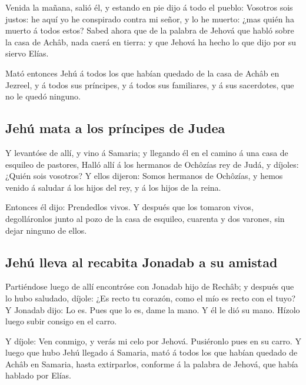  Venida la mañana, salió él, y estando en pie dijo á todo el
pueblo: Vosotros sois justos: he aquí yo he conspirado contra mi señor,
y lo he muerto: ¿mas quién ha muerto á todos estos?  Sabed
ahora que de la palabra de Jehová que habló sobre la casa de Achâb, nada
caerá en tierra: y que Jehová ha hecho lo que dijo por su siervo Elías.

 Mató entonces Jehú á todos los que habían quedado de la
casa de Achâb en Jezreel, y á todos sus príncipes, y á todos sus
familiares, y á sus sacerdotes, que no le quedó ninguno.

\hypertarget{jehuxfa-mata-a-los-pruxedncipes-de-judea}{%
\subsection{Jehú mata a los príncipes de
Judea}\label{jehuxfa-mata-a-los-pruxedncipes-de-judea}}

 Y levantóse de allí, y vino á Samaria; y llegando él en el
camino á una casa de esquileo de pastores,  Halló allí á
los hermanos de Ochôzías rey de Judá, y díjoles: ¿Quién sois vosotros? Y
ellos dijeron: Somos hermanos de Ochôzías, y hemos venido á saludar á
los hijos del rey, y á los hijos de la reina.

 Entonces él dijo: Prendedlos vivos. Y después que los
tomaron vivos, degolláronlos junto al pozo de la casa de esquileo,
cuarenta y dos varones, sin dejar ninguno de ellos.

\hypertarget{jehuxfa-lleva-al-recabita-jonadab-a-su-amistad}{%
\subsection{Jehú lleva al recabita Jonadab a su
amistad}\label{jehuxfa-lleva-al-recabita-jonadab-a-su-amistad}}

 Partiéndose luego de allí encontróse con Jonadab hijo de
Rechâb; y después que lo hubo saludado, díjole: ¿Es recto tu corazón,
como el mío es recto con el tuyo? Y Jonadab dijo: Lo es. Pues que lo es,
dame la mano. Y él le dió su mano. Hízolo luego subir consigo en el
carro.

 Y díjole: Ven conmigo, y verás mi celo por Jehová.
Pusiéronlo pues en su carro.  Y luego que hubo Jehú llegado
á Samaria, mató á todos los que habían quedado de Achâb en Samaria,
hasta extirparlos, conforme á la palabra de Jehová, que había hablado
por Elías.

